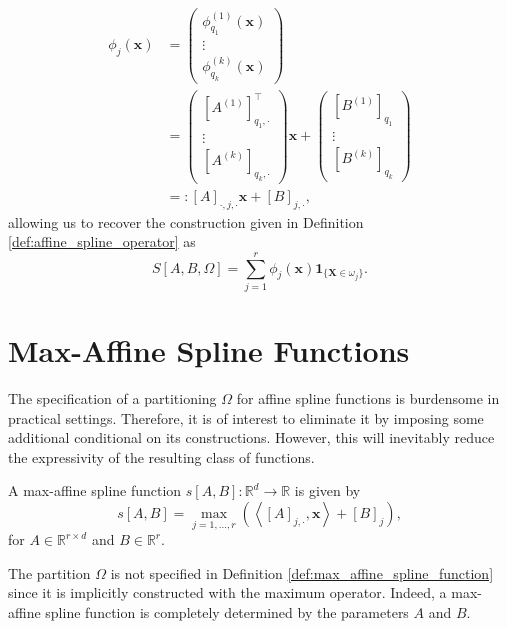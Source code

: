 \begin{align*}
    \phi_j(\mathbf{x})&=\begin{pmatrix}\phi_{q_1}^{(1)}(\mathbf{x})\\\vdots\\\phi_{q_k}^{(k)}(\mathbf{x})\end{pmatrix}\\&=\begin{pmatrix}\left[A^{(1)}\right]_{q_1,\cdot}^\top\\\vdots\\\left[A^{(k)}\right]_{q_k,\cdot}\end{pmatrix}\mathbf{x}+\begin{pmatrix}\left[B^{(1)}\right]_{q_1}\\\vdots\\\left[B^{(k)}\right]_{q_k}\end{pmatrix}\\&=:[A]_{\cdot,j,\cdot}\mathbf{x}+[B]_{j,\cdot},
\end{align*}
allowing us to recover the construction given in Definition \ref{def:affine_spline_operator} as $$S\left[A,B,\Omega\right]=\sum_{j=1}^r\phi_j(\mathbf{x})\mathbf{1}_{\{\mathbf{X}\in\omega_j\}}.$$

\section{Max-Affine Spline Functions}

The specification of a partitioning $\Omega$ for affine spline functions is burdensome in practical settings. Therefore, it is of interest to eliminate it by imposing some additional conditional on its constructions. However, this will inevitably reduce the expressivity of the resulting class of functions.

\begin{definition}\label{def:max_affine_spline_function}
    A max-affine spline function $s[A,B]:\mathbb{R}^d\to\mathbb{R}$ is given by $$s[A,B]=\max_{j=1,\dots,r}\left(\left\langle[A]_{j,\cdot},\mathbf{x}\right\rangle+[B]_j\right),$$for $A\in\mathbb{R}^{r\times d}$ and $B\in\mathbb{R}^r$.
\end{definition}

\begin{remark}
    The partition $\Omega$ is not specified in Definition \ref{def:max_affine_spline_function} since it is implicitly constructed with the maximum operator. Indeed, a max-affine spline function is completely determined by the parameters $A$ and $B$.
\end{remark}

